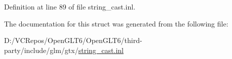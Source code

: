 Definition at line 89 of file string\+\_\+cast.\+inl.



The documentation for this struct was generated from the following file\+:\begin{DoxyCompactItemize}
\item 
D\+:/\+V\+C\+Repos/\+Open\+G\+L\+T6/\+Open\+G\+L\+T6/third-\/party/include/glm/gtx/\mbox{\hyperlink{string__cast_8inl}{string\+\_\+cast.\+inl}}\end{DoxyCompactItemize}
